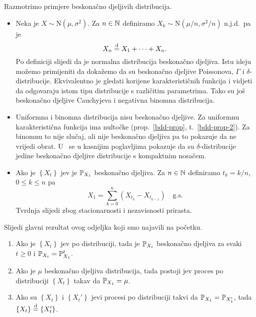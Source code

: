 \documentclass[main.tex]{subfiles}
\begin{document}
\begin{komentar} \label{bdd-komentar}
	Razmotrimo primjere beskonačno djeljivih distribucija.
	\begin{itemize}
		\item Neka je \( X \sim \mathrm N(\mu, \sigma^2) \). Za \( n \in \N \) definiramo \( X_k \sim \mathrm N(\mu/n, \sigma^2/n) \) n.j.d.\ pa je
		      \[
			      X_n \jpod X_1 + \cdots + X_n.
		      \]
		      Po definiciji slijedi da je normalna distribucija beskonačno djeljiva. Istu ideju možemo primijeniti da dokažemo da su beskonačno djeljive Poissonova,
		      \( \Gamma \) i \( \delta \)-distribucije. Ekvivalentno je gledati korijene karakterističnih funkcija i vidjeti da odgovaraju istom tipu distribucije
		      s različitim parametrima. Tako su još beskonačno djeljive Cauchyjeva i negativna binomna distribucija.

		\item Uniformna i binomna distribucija nisu beskonačno djeljive. Za uniformnu karakteristična funkcija ima nultočke (prop.~\ref{bdd-prop}, t.~\ref{bdd-prop-2}).
		      Za binomnu to nije slučaj, ali nije beskonačno djeljiva pa to pokazuje da ne vrijedi obrat. U~\cite{sato} se u kasnijim poglavljima pokazuje da su \( \delta \)-distribucije
		      jedine beskonačno djeljive distribucije s kompaktnim nosačem.

		\item Ako je \( \left\{ X_t \right\} \) \levy jev je \( \P_{X_1} \) beskonačno djeljiva. Za \( n \in \N \) definiramo \( t_k = k/n \), \( 0 \le k \le n \) pa
		      \[
			      X_1 = \sum_{k=0}^n \left( X_{t_k} - X_{t_{k-1}} \right) \quad \mathrm{g.s.}
		      \]
		      Tvrdnja slijedi zbog stacionarnosti i nezavisnosti prirasta.
	\end{itemize}
\end{komentar}

Slijedi glavni rezultat ovog odjeljka koji smo najavili na početku.
\begin{teorem} \label{bddlpd}
	\begin{enumerate}[label=(\roman*)]
		\item Ako je \( \left\{X_t\right\} \) \levy jev po distribuciji, tada je \( \P_{X_t} \) beskonačno djeljiva za svaki \( t \geq 0 \) i \( \P_{X_t} = \P_{X_1}^t \). \label{bddlpd1}
		\item Ako je \( \mu \) beskonačno djeljiva distribucija, tada postoji \levy jev proces po distribuciji \( \left\{ X_t \right\} \) takav da \( \P_{X_1} = \mu \). \label{bddlpd2}
		\item Ako su \( \left\{ X_t \right\} \) i \( \left\{ X_t' \right\} \) \levy jevi procesi po distribuciji takvi da \( \P_{X_1} = \P_{X_1'} \), tada \( \left\{ X_t \right\} \jpod \left\{ X_t' \right\}\). \label{bddlpd3}
	\end{enumerate}
\end{teorem}
\end{document}
